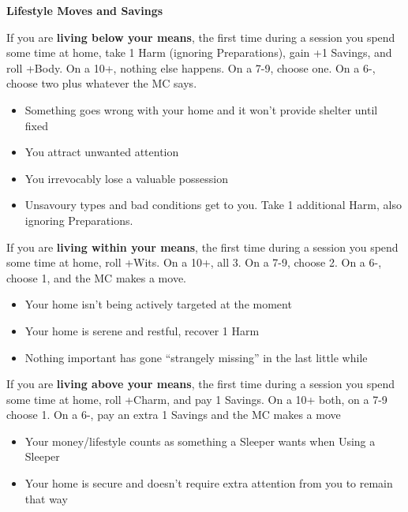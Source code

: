 \documentclass[letterpaper,10pt]{article}
\newenvironment{move}{}{}
\newcommand{\TRIGGER}[1]{\textbf{#1}}
\newcommand{\TITLE}[1]{\begin{center}{\titlefont\Huge\textbf{#1}}\end{center}}
\begin{document}
\TITLE{Lifestyle Moves and Savings}

\begin{multicols}{2}

\begin{move}
  If you are \TRIGGER{living below your means}, the first time during
  a session you spend some time at home, take 1 Harm (ignoring
  Preparations), gain +1 Savings, and roll +Body. On a 10+, nothing
  else happens. On a 7-9, choose one. On a 6-, choose two plus
  whatever the MC says.
  \begin{itemize}
  \item Something goes wrong with your home and it won't provide
    shelter until fixed
  \item You attract unwanted attention
  \item You irrevocably lose a valuable possession
  \item Unsavoury types and bad conditions get to you. Take 1
    additional Harm, also ignoring Preparations.
  \end{itemize}
\end{move}

\bigskip

\begin{move}
  If you are \TRIGGER{living within your means}, the first time during
  a session you spend some time at home, roll +Wits. On a 10+, all
  3. On a 7-9, choose 2. On a 6-, choose 1, and the MC makes a move.
  \begin{itemize}
  \item Your home isn't being actively targeted at the moment
  \item Your home is serene and restful, recover 1 Harm
  \item Nothing important has gone ``strangely missing'' in the last
    little while
  \end{itemize}
\end{move}

\bigskip

\begin{move}
  If you are \TRIGGER{living above your means}, the first time during
  a session you spend some time at home, roll +Charm, and pay 1
  Savings. On a 10+ both, on a 7-9 choose 1. On a 6-, pay an extra 1
  Savings and the MC makes a move
  \begin{itemize}
    \item Your money/lifestyle counts as something a Sleeper wants
      when Using a Sleeper
    \item Your home is secure and doesn't require extra attention from
      you to remain that way
  \end{itemize}
\end{move}


\end{multicols}
\end{document}

